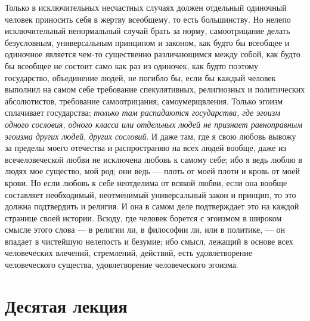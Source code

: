 \documentclass[12pt]{article}
\begin{document}
Только в исключительных несчастных случаях должен отдельный одиночный человек приносить себя в жертву всеобщему, то есть большинству. Но нелепо исключительный ненормальный случай брать за норму, самоотрицание делать безусловным, универсальным принципом и законом, как будто бы всеобщее и одиночное является чем-то существенно различающимся между собой, как будто бы всеобщее не состоит само как раз из одиночек, как будто поэтому государство, объединение людей, не погибло бы, если бы каждый человек выполнил на самом себе требование спекулятивных, религиозных и политических абсолютистов, требование самоотрицания, самоумерщвления. Только эгоизм сплачивает государства; \emph{только там распадаются государства, где эгоизм одного сословия, одного класса или отдельных людей не признает равноправным эгоизма других людей, других сословий}. И даже там, где я свою любовь вывожу за пределы моего отечества и распространяю на всех людей вообще, даже из всечеловеческой любви не исключена любовь к самому себе; ибо я ведь люблю в людях мое существо, мой род; они ведь --- плоть от моей плоти и кровь от моей крови. Но если любовь к себе неотделима от всякой любви, если она вообще составляет необходимый, неотменимый универсальный закон и принцип, то это должна подтвердить и религия. И она в самом деле подтверждает это на каждой странице своей истории. Всюду, где человек борется с эгоизмом в широком смысле этого слова --- в религии ли, в философии ли, или в политике, --- он впадает в чистейшую нелепость и безумие; ибо смысл, лежащий в основе всех человеческих влечений, стремлений, действий, есть удовлетворение человеческого существа, удовлетворение человеческого эгоизма. 

{}
\section*{Десятая лекция}
\end{document}
